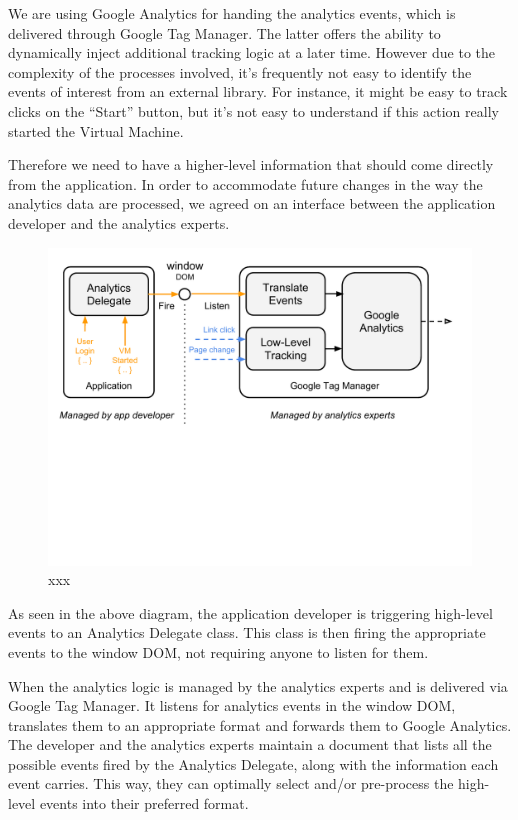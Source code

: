 \documentclass{article}
\begin{document}
We are using Google Analytics for handing the analytics events, which is delivered through Google Tag Manager. The latter offers the ability to dynamically inject additional tracking logic at a later time. However due to the complexity of the processes involved, it’s frequently not easy to identify the events of interest from an external library. For instance, it might be easy to track clicks on the “Start” button, but it’s not easy to understand if this action really started the Virtual Machine.

Therefore we need to have a higher-level information that should come directly from the application. In order to accommodate future changes in the way the analytics data are processed, we agreed on an interface between the application developer and the analytics experts. 


\begin{figure}[t]
  \begin{center}
		\includegraphics[width=\columnwidth]{imgs/CERN60Events.pdf}
  \end{center}
\caption{xxx}
\label{xxx}
\end{figure}



As seen in the above diagram, the application developer is triggering high-level events to an Analytics Delegate class. This class is then firing the appropriate events to the window DOM, not requiring anyone to listen for them.

When the analytics logic is managed by the analytics experts and is delivered via Google Tag Manager. It listens for analytics events in the window DOM, translates them to an appropriate format and forwards them to Google Analytics. The developer and the analytics experts maintain a document that lists all the possible events fired by the Analytics Delegate, along with the information each event carries. This way, they can optimally select and/or pre-process the high-level events into their preferred format.
\end{document}
